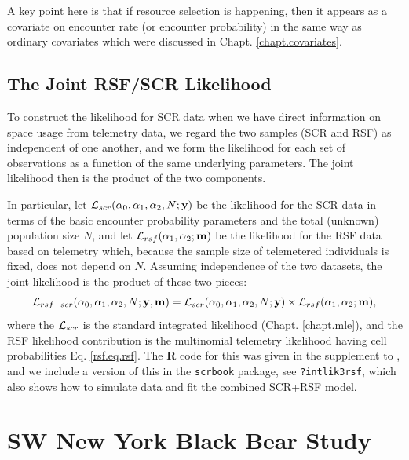 A key point here is that if resource selection is happening, then it
appears as a covariate on encounter rate (or encounter
probability) in the same way as ordinary covariates which were discussed in
Chapt. \ref{chapt.covariates}.


\subsection{The Joint RSF/SCR Likelihood}

To construct the likelihood for SCR data when we have 
direct information on space usage
from telemetry data, we regard the two samples (SCR and RSF) as
independent of one another, and we 
 form the likelihood for each set of observations as a function
of the same underlying parameters. The joint likelihood then is the
product of the two components. 

In particular, let ${\cal L}_{scr}(\alpha_{0}, \alpha_{1}, \alpha_{2}, N;{\bf y})$
be the likelihood for the SCR data in terms of the basic encounter
probability parameters and the total (unknown) population size $N$,
and let ${\cal L}_{rsf}(\alpha_{1},\alpha_{2}; {\bf m})$ be the
likelihood for the RSF data based on telemetry which, because the
sample size of telemetered individuals is fixed, does not depend on $N$.
Assuming independence of the two datasets, the
joint likelihood is the product of these two pieces:
\[
{\cal L}_{rsf+scr}(\alpha_{0},\alpha_{1},\alpha_{2},N; {\bf y},{\bf
  m})  =
{\cal L}_{scr}(\alpha_{0}, \alpha_{1}, \alpha_{2}, N;{\bf y})
\times
{\cal L}_{rsf}(\alpha_{1},\alpha_{2}; {\bf m}),
\]
where the ${\cal L}_{scr}$ is the standard integrated likelihood
(Chapt. \ref{chapt.mle}), and the RSF likelihood contribution is the
multinomial telemetry likelihood having cell probabilities
Eq. \ref{rsf.eq.rsf}.  The {\bf R} code for this 
was given in the
supplement to \citet{royle_etal:2012mee}, and we include a version of
this in the \mbox{\tt scrbook} package, see \mbox{\tt ?intlik3rsf},
which also shows how to simulate data and fit the combined SCR+RSF
model.


\section{SW  New York Black Bear Study}
\label{rsf.chapt.nybears}

